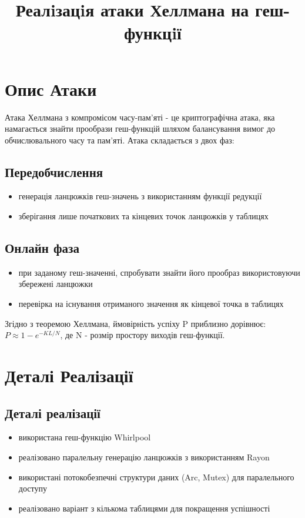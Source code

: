 \documentclass[12pt]{article}
\title{\textbf{Реалiзацiя атаки Хеллмана на геш-функцiї}}
\author{}
\date{}
\begin{document}
\maketitle

\section{Опис Атаки}
Атака Хеллмана з компромісом часу-пам'яті - це криптографічна атака, яка намагається знайти прообрази геш-функцій шляхом балансування вимог до обчислювального часу та пам'яті. Атака складається з двох фаз:

\subsection{Передобчислення}
\begin{itemize}
  \item генерація ланцюжків геш-значень з використанням функції редукції
  \item зберігання лише початкових та кінцевих точок ланцюжків у таблицях
\end{itemize}

\subsection{Онлайн фаза}
\begin{itemize}
  \item при заданому геш-значенні, спробувати знайти його прообраз використовуючи збережені ланцюжки
  \item перевірка на існування отриманого значення як кінцевої точка в таблицях
\end{itemize}

Згідно з теоремою Хеллмана, ймовірність успіху P приблизно дорівнює:
$ P \approx 1 - e^{-KL/N} $, де N - розмір простору виходів геш-функції.

\section{Деталі Реалізації}

\subsection{Деталі реалізації}
\begin{itemize}
  \item використана геш-функцію Whirlpool
  \item реалізовано паралельну генерацію ланцюжків з використанням Rayon
  \item використані потокобезпечні структури даних (Arc, Mutex) для паралельного доступу
  \item реалізовано варіант з кількома таблицями для покращення успішності
\end{itemize}
\end{document}
